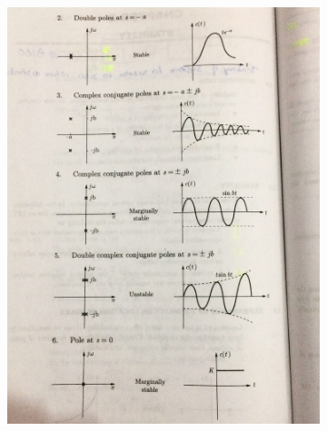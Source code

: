 \documentclass[12pt,a4paper]{article}
\begin{document}
	\begin{figure}[h]
		\centering
		\begin{subfigure}{.5\textwidth}
			\centering
			\includegraphics[width=\linewidth]{src/fig1}
			\label{fig:sub1}
		\end{subfigure}%
		\begin{subfigure}{.5\textwidth}
			\centering

\end{subfigure}
\end{figure}
\end{document}
